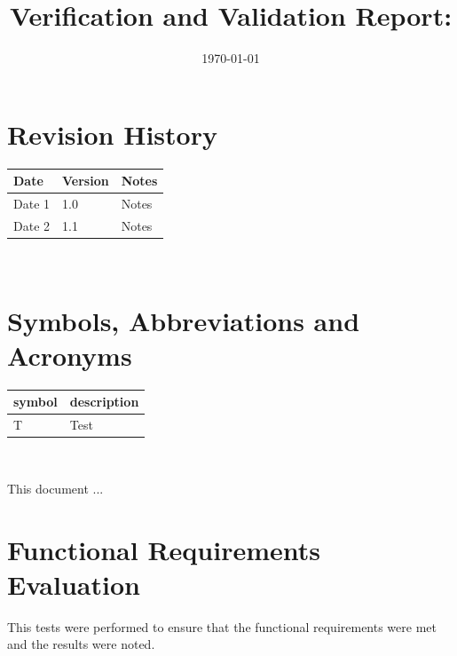 \documentclass[12pt, titlepage]{article}
\begin{document}
\title{Verification and Validation Report: \progname}
\author{\authname}
\date{\today}

\maketitle


\section{Revision History}

\begin{tabularx}{\textwidth}{p{3cm}p{2cm}X}
  \toprule {\bf Date} & {\bf Version} & {\bf Notes} \\
  \midrule
  Date 1              & 1.0           & Notes       \\
  Date 2              & 1.1           & Notes       \\
  \bottomrule
\end{tabularx}

~\newpage

\section{Symbols, Abbreviations and Acronyms}

\renewcommand{\arraystretch}{1.2}
\begin{tabular}{l l}
  \toprule
  \textbf{symbol} & \textbf{description} \\
  \midrule
  T               & Test                 \\
  \bottomrule
\end{tabular}\\


\newpage

\tableofcontents

\listoftables %

\listoffigures %

\newpage


This document ...

\section{Functional Requirements Evaluation}
This tests were performed to ensure that the functional requirements were met and the results were noted.
\end{document}
